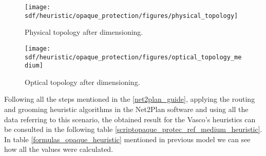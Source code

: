 \begin{figure}[H]
\centering
\texttt{[image: sdf/heuristic/opaque\_protection/figures/physical\_topology]}
\caption{Physical topology after dimensioning.}
\label{physical_topology_protec_ref_medium_heuristic}
\end{figure}

\begin{figure}[H]
\centering
\texttt{[image: sdf/heuristic/opaque\_protection/figures/optical\_topology\_medium]}
\caption{Optical topology after dimensioning.}
\label{optical_topology_protec_ref_medium_heuristic}
\end{figure}

Following all the steps mentioned in the \ref{net2plan_guide}, applying the routing and grooming heuristic algorithms in the Net2Plan software and using all the data referring to this scenario, the obtained result for the Vasco's heuristics can be consulted in the following table \ref{scriptopaque_protec_ref_medium_heuristic}. In table \ref{formulas_opaque_heuristic} mentioned in previous model we can see how all the values were calculated. \\

